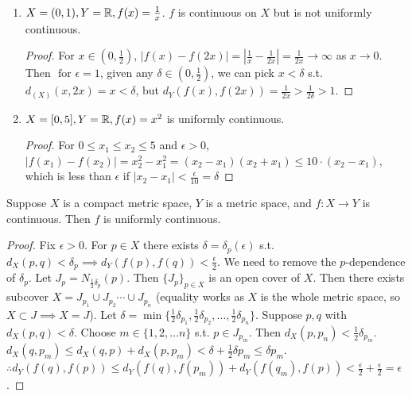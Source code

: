 \begin{example}
	\begin{enumerate}
		\item $X=(0,1), Y=\mathbb{R},f(x)=\frac{1}{x}$. $f$ is continuous on $X$ but is not uniformly continuous.
		      \begin{proof}
			      For $x \in (0,\frac{1}{2})$, $|f(x)-f(2x)|=|\frac{1}{x}-\frac{1}{2x}|=\frac{1}{2x}\to \infty$ as $x \to 0$. Then $\text{ for } \epsilon=1$, given any $\delta \in (0,\frac{1}{2})$, we can pick $x<\delta$ s.t. $d_(X)(x,2x)=x<\delta$, but $d_Y(f(x),f(2x))=\frac{1}{2x}>\frac{1}{2 \delta}>1$.
		      \end{proof}
		\item $X=[0,5], Y=\mathbb{R},f(x)=x^2$ is uniformly continuous.
		      \begin{proof}
			      For $0\le x_1\le x_2\le 5$ and $\epsilon>0$, $|f(x_1)-f(x_2)|=x_2^2-x_1^2=(x_2-x_1)(x_2+x_1)\le 10 \cdot (x_2-x_1)$, which is less than $\epsilon$ if $|x_2-x_1|<\frac{\epsilon}{10}=\delta$
		      \end{proof}
	\end{enumerate}
\end{example}

\begin{theorem}[19]
	Suppose $X$ is a compact metric space, $Y$ is a metric space, and $f:X\to Y$ is continuous. Then $f$ is uniformly continuous.
	\begin{proof}
		Fix $\epsilon>0$. For $p \in X$ there exists $\delta=\delta_p(\epsilon)$ s.t. $d_{X}(p,q)<\delta_{p}\implies d_Y(f(p),f(q))<\frac{\epsilon}{2}$.
		We need to remove the $p$-dependence of $\delta_p$.
		Let $J_{p}=N_{\frac{1}{2}\delta_{p}}(p)$. Then $\{ {J}_{p}\}_{p \in X}$ is an open cover of $X$.
		Then there exists subcover $X= J_{p_1} \cup J_{p_2}\cdots \cup J_{p_n}$ (equality works as $X$ is the whole metric space, so $X \subset J \implies X=J$).
		Let $\delta=\min\{\frac{1}{2}\delta_{p_1},\frac{1}{2}\delta_{p_2},\ldots ,\frac{1}{2}\delta_{p_n}\}$.
		Suppose $p,q$ with $d_{X}(p,q)<\delta$. Choose $m \in \{1,2,\ldots n\}$ s.t. $p \in J_{p_m}$. Then $d_{X}(p,p_{n})<\frac{1}{2}\delta_{p_{m}}$.
		$d_X(q,p_{m})\le d_X(q,p)+d_{X}(p,p_{m})<\delta+\frac{1}{2}\delta p_{m}\le \delta p_m$.
		$\therefore d_Y(f(q),f(p))\le d_Y(f(q),f(p_{m}))+d_Y(f(q_m),f(p))<\frac{\epsilon}{2}+\frac{\epsilon}{2}=\epsilon$.
	\end{proof}
\end{theorem}


